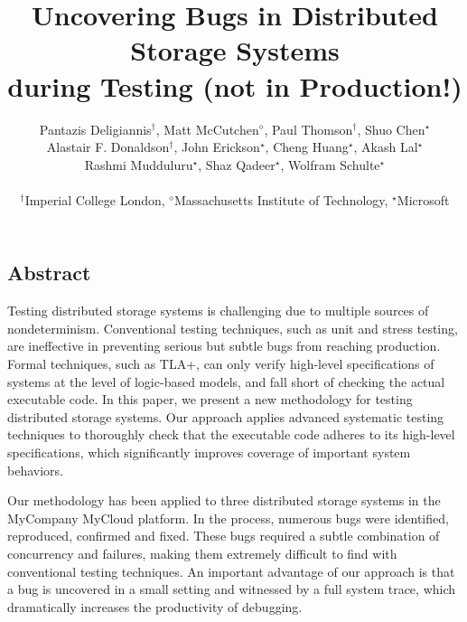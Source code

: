 \documentclass[letterpaper,twocolumn,10pt]{article}
\newcommand{\Azure}{MyCloud\xspace}
\newcommand{\Microsoft}{MyCompany\xspace}
\begin{document}
\date{}

\title{\Large \bf Uncovering Bugs in Distributed Storage Systems\\during Testing (not in Production!)}

\author{
{\rm Pantazis Deligiannis$^\dagger$, Matt McCutchen$^\diamond$, Paul Thomson$^\dagger$, Shuo Chen$^\star$}\\
{\rm Alastair F. Donaldson$^\dagger$, John Erickson$^\star$, Cheng Huang$^\star$, Akash Lal$^\star$}\\
{\rm Rashmi Mudduluru$^\star$, Shaz Qadeer$^\star$, Wolfram Schulte$^\star$}\\\\
$^\dagger$Imperial College London, $^\diamond$Massachusetts Institute of Technology, $^\star$Microsoft\\
} %

\maketitle

\thispagestyle{empty}

\subsection*{Abstract}
Testing distributed storage systems is challenging due to multiple sources of nondeterminism. Conventional testing techniques, such as unit and stress testing, are ineffective in preventing serious but subtle bugs from reaching production. Formal techniques, such as TLA+, can only verify high-level specifications of systems at the level of logic-based models, and fall short of checking the actual executable code. In this paper, we present a new methodology for testing distributed storage systems. Our approach applies advanced systematic testing techniques to thoroughly check that the executable code adheres to its high-level specifications, which significantly improves coverage of important system behaviors.

Our methodology has been applied to three distributed storage systems in the \Microsoft \Azure platform. In the process, numerous bugs were identified, reproduced, confirmed and fixed. These bugs required a subtle combination of concurrency and failures, making them extremely difficult to find with conventional testing techniques. An important advantage of our approach is that a bug is uncovered in a small setting and witnessed by a full system trace, which dramatically increases the productivity of debugging.
\end{document}
